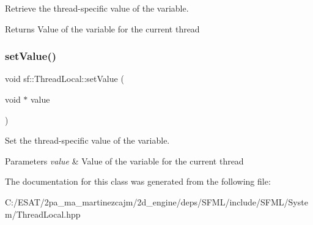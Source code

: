 Retrieve the thread-\/specific value of the variable. 

\begin{DoxyReturn}{Returns}
Value of the variable for the current thread 
\end{DoxyReturn}
\mbox{\label{classsf_1_1_thread_local_ab7e334c83d77644a8e67ee31c3230007}} 
\subsubsection{\texorpdfstring{set\+Value()}{setValue()}}
{\footnotesize\ttfamily void sf\+::\+Thread\+Local\+::set\+Value (\begin{DoxyParamCaption}\item[{void $\ast$}]{value }\end{DoxyParamCaption})}



Set the thread-\/specific value of the variable. 


\begin{DoxyParams}{Parameters}
{\em value} & Value of the variable for the current thread \\
\hline
\end{DoxyParams}


The documentation for this class was generated from the following file\+:\begin{DoxyCompactItemize}
\item 
C\+:/\+E\+S\+A\+T/2pa\+\_\+ma\+\_\+martinezcajm/2d\+\_\+engine/deps/\+S\+F\+M\+L/include/\+S\+F\+M\+L/\+System/Thread\+Local.\+hpp\end{DoxyCompactItemize}
